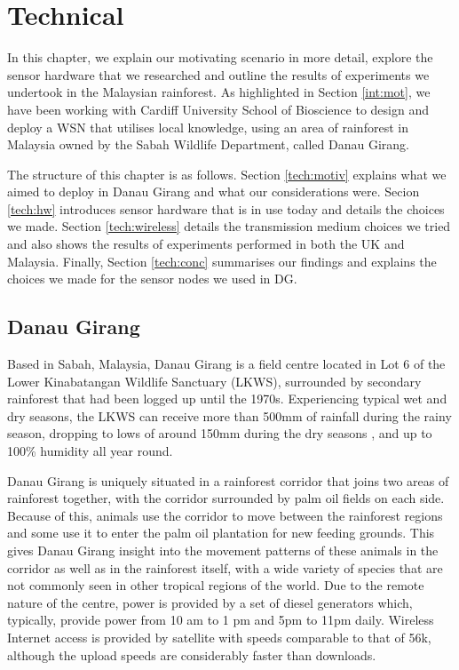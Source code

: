 \chapter{Technical}
	In this chapter, we explain our motivating scenario in more detail, explore the sensor hardware that we researched and outline the results of experiments we undertook in the Malaysian rainforest. As highlighted in Section \ref{int:mot}, we have been working with Cardiff University School of Bioscience to design and deploy a WSN that utilises local knowledge, using an area of rainforest in Malaysia owned by the Sabah Wildlife Department, called Danau Girang.

The structure of this chapter is as follows. Section \ref{tech:motiv} explains what we aimed to deploy in Danau Girang and what our considerations were. Secion \ref{tech:hw} introduces sensor hardware that is in use today and details the choices we made. Section \ref{tech:wireless} details the transmission medium choices we tried and also shows the results of experiments performed in both the UK and Malaysia. Finally, Section \ref{tech:conc} summarises our findings and explains the choices we made for the sensor nodes we used in DG. 

\section{Danau Girang}
	Based in Sabah, Malaysia, Danau Girang is a field centre located in Lot 6 of the Lower Kinabatangan Wildlife Sanctuary (LKWS), surrounded by secondary rainforest that had been logged up until the 1970s. Experiencing typical wet and dry seasons, the LKWS can receive more than 500mm of rainfall during the rainy season, dropping to lows of around 150mm during the dry seasons \cite{Walsh2009}, and up to 100\% humidity all year round. 

Danau Girang is uniquely situated in a rainforest corridor that joins two areas of rainforest together, with the corridor surrounded by palm oil fields on each side. Because of this, animals use the corridor to move between the rainforest regions and some use it to enter the palm oil plantation for new feeding grounds. This gives Danau Girang insight into the movement patterns of these animals in the corridor as well as in the rainforest itself, with a wide variety of species that are not commonly seen in other tropical regions of the world. Due to the remote nature of the centre, power is provided by a set of diesel generators which, typically, provide power from 10 am to 1 pm and 5pm to 11pm daily. Wireless Internet access is provided by satellite with speeds comparable to that of 56k, although the upload speeds are considerably faster than downloads.

